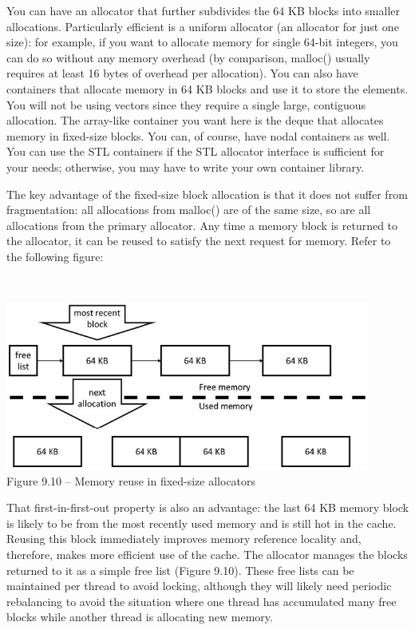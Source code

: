 You can have an allocator that further subdivides the 64 KB blocks into smaller allocations. Particularly efficient is a uniform allocator (an allocator for just one size): for example, if you want to allocate memory for single 64-bit integers, you can do so without any memory overhead (by comparison, malloc() usually requires at least 16 bytes of overhead per allocation). You can also have containers that allocate memory in 64 KB blocks and use it to store the elements. You will not be using vectors since they require a single large, contiguous allocation. The array-like container you want here is the deque that allocates memory in fixed-size blocks. You can, of course, have nodal containers as well. You can use the STL containers if the STL allocator interface is sufficient for your needs; otherwise, you may have to write your own container library.

The key advantage of the fixed-size block allocation is that it does not suffer from fragmentation: all allocations from malloc() are of the same size, so are all allocations from the primary allocator. Any time a memory block is returned to the allocator, it can be reused to satisfy the next request for memory. Refer to the following figure:

\hspace*{\fill} \\ %
\begin{center}
\includegraphics[width=0.9\textwidth]{content/3/chapter9/images/10.jpg}\\
Figure 9.10 – Memory reuse in fixed-size allocators
\end{center}

That first-in-first-out property is also an advantage: the last 64 KB memory block is likely to be from the most recently used memory and is still hot in the cache. Reusing this block immediately improves memory reference locality and, therefore, makes more efficient use of the cache. The allocator manages the blocks returned to it as a simple free list (Figure 9.10). These free lists can be maintained per thread to avoid locking, although they will likely need periodic rebalancing to avoid the situation where one thread has accumulated many free blocks while another thread is allocating new memory.

